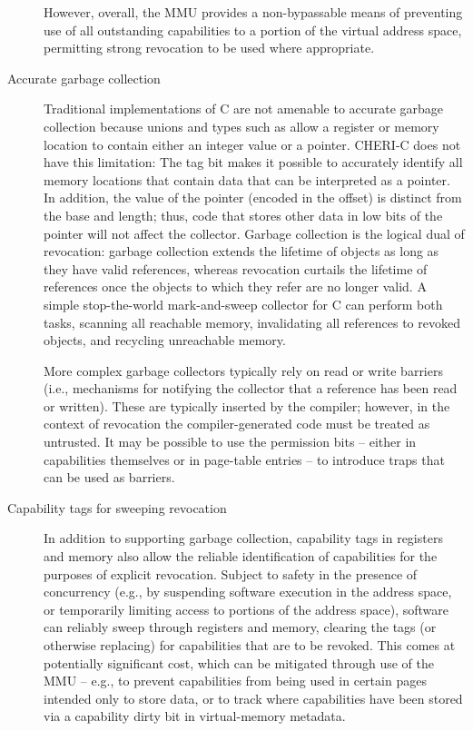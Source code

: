 \begin{description}
  However, overall, the MMU provides a non-bypassable means of preventing use
  of all outstanding capabilities to a portion of the virtual address space,
  permitting strong revocation to be used where appropriate.

\item[Accurate garbage collection]
  Traditional implementations of C are not amenable to accurate garbage
  collection because unions and types such as  allow a register
  or memory location to contain either an integer value or a pointer.
  CHERI-C does not have this limitation: The tag bit makes it possible to
  accurately identify all memory locations that contain data that can be
  interpreted as a pointer.
  In addition, the value of the pointer (encoded in the offset) is distinct from
  the base and length; thus, code that stores other data in low bits of the
  pointer will not affect the collector.
  Garbage collection is the logical dual of revocation: garbage collection
  extends the lifetime of objects as long as they have valid references, whereas
  revocation curtails the lifetime of references once the objects to which they
  refer are no longer valid.
  A simple stop-the-world mark-and-sweep collector for C can perform both tasks,
  scanning all reachable memory, invalidating all references to revoked objects, and recycling unreachable memory.

  More complex garbage collectors typically rely on read or write barriers
  (i.e., mechanisms for notifying the collector that a reference has been read or
  written).
  These are typically inserted by the compiler; however, in the context of revocation
  the compiler-generated code must be treated as untrusted.
  It may be possible to use the permission bits -- either in capabilities
  themselves or in page-table entries -- to introduce traps that can be used as
  barriers.

\item[Capability tags for sweeping revocation]
  In addition to supporting garbage collection, capability tags in registers
  and memory also allow the reliable identification of capabilities for the
  purposes of explicit revocation.
  Subject to safety in the presence of concurrency (e.g., by suspending
  software execution in the address space, or temporarily limiting
  access to portions of the address space), software can reliably
  sweep through registers and memory, clearing the tags (or otherwise
  replacing)
for
 capabilities that are to be revoked.
  This comes at potentially significant cost, which can be mitigated through
  use of the MMU -- e.g., to prevent capabilities from being used in certain
  pages intended only to store data, or to track where capabilities have been
  stored via a capability dirty bit in virtual-memory metadata.


\end{description}
